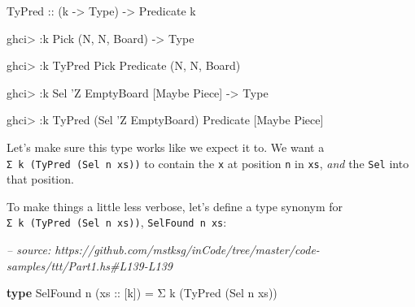 \documentclass[]{article}
\newenvironment{Shaded}{}{}
\newcommand{\CommentTok}[1]{\textcolor[rgb]{0.38,0.63,0.69}{\textit{#1}}}
\newcommand{\DataTypeTok}[1]{\textcolor[rgb]{0.56,0.13,0.00}{#1}}
\newcommand{\FunctionTok}[1]{\textcolor[rgb]{0.02,0.16,0.49}{#1}}
\newcommand{\KeywordTok}[1]{\textcolor[rgb]{0.00,0.44,0.13}{\textbf{#1}}}
\newcommand{\NormalTok}[1]{#1}
\newcommand{\OtherTok}[1]{\textcolor[rgb]{0.00,0.44,0.13}{#1}}
\begin{document}
\begin{Shaded}
\begin{Highlighting}[]
\DataTypeTok{TyPred}\OtherTok{ ::}\NormalTok{ (k }\OtherTok{->} \DataTypeTok{Type}\NormalTok{) }\OtherTok{->} \DataTypeTok{Predicate}\NormalTok{ k}
\end{Highlighting}
\end{Shaded}

\begin{Shaded}
\begin{Highlighting}[]
\NormalTok{ghci}\FunctionTok{>} \FunctionTok{:}\NormalTok{k }\DataTypeTok{Pick}
\NormalTok{(}\DataTypeTok{N}\NormalTok{, }\DataTypeTok{N}\NormalTok{, }\DataTypeTok{Board}\NormalTok{) }\OtherTok{->} \DataTypeTok{Type}

\NormalTok{ghci}\FunctionTok{>} \FunctionTok{:}\NormalTok{k }\DataTypeTok{TyPred} \DataTypeTok{Pick}
\DataTypeTok{Predicate}\NormalTok{ (}\DataTypeTok{N}\NormalTok{, }\DataTypeTok{N}\NormalTok{, }\DataTypeTok{Board}\NormalTok{)}

\NormalTok{ghci}\FunctionTok{>} \FunctionTok{:}\NormalTok{k }\DataTypeTok{Sel}\NormalTok{ '}\DataTypeTok{Z} \DataTypeTok{EmptyBoard}
\NormalTok{[}\DataTypeTok{Maybe} \DataTypeTok{Piece}\NormalTok{] }\OtherTok{->} \DataTypeTok{Type}

\NormalTok{ghci}\FunctionTok{>} \FunctionTok{:}\NormalTok{k }\DataTypeTok{TyPred}\NormalTok{ (}\DataTypeTok{Sel}\NormalTok{ '}\DataTypeTok{Z} \DataTypeTok{EmptyBoard}\NormalTok{)}
\DataTypeTok{Predicate}\NormalTok{ [}\DataTypeTok{Maybe} \DataTypeTok{Piece}\NormalTok{]}
\end{Highlighting}
\end{Shaded}

Let's make sure this type works like we expect it to. We want a
\texttt{Σ\ k\ (TyPred\ (Sel\ n\ xs))} to contain the \texttt{x} at position
\texttt{n} in \texttt{xs}, \emph{and} the \texttt{Sel} into that position.

To make things a little less verbose, let's define a type synonym for
\texttt{Σ\ k\ (TyPred\ (Sel\ n\ xs))}, \texttt{SelFound\ n\ xs}:

\begin{Shaded}
\begin{Highlighting}[]
\CommentTok{-- source: https://github.com/mstksg/inCode/tree/master/code-samples/ttt/Part1.hs#L139-L139}

\KeywordTok{type} \DataTypeTok{SelFound}\NormalTok{ n (}\OtherTok{xs ::}\NormalTok{ [k]) }\FunctionTok{=}\NormalTok{ Σ k (}\DataTypeTok{TyPred}\NormalTok{ (}\DataTypeTok{Sel}\NormalTok{ n xs))}
\end{Highlighting}
\end{Shaded}
\end{document}
